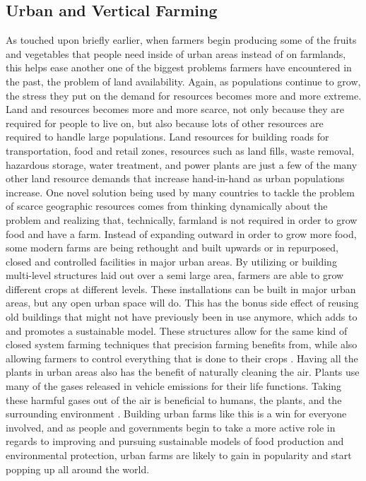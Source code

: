 \documentclass[sigconf]{acmart}
\begin{document}
\subsection{Urban and Vertical Farming}

As touched upon briefly earlier, when farmers begin producing some of the fruits and vegetables that people need inside of urban areas instead of on farmlands, this helps ease another one of the biggest problems farmers have encountered in the past, the problem of land availability. Again, as populations continue to grow, the stress they put on the demand for resources becomes more and more extreme. Land and resources becomes more and more scarce, not only because they are required for people to live on, but also because lots of other resources are required to handle large populations. Land resources for building roads for transportation, food and retail zones, resources such as land fills, waste removal, hazardous storage, water treatment, and power plants are just a few of the many other land resource demands that increase hand-in-hand as urban populations increase. One novel solution being used by many countries to tackle the problem of scarce geographic resources comes from thinking dynamically about the problem and realizing that, technically, farmland is not required in order to grow food and have a farm. Instead of expanding outward in order to grow more food, some modern farms are being rethought and built upwards or in repurposed, closed and controlled facilities in major urban areas. By utilizing or building multi-level structures laid out over a semi large area, farmers are able to grow different crops at different levels. These installations can be built in major urban areas, but any open urban space will do. This has the bonus side effect of reusing old buildings that might not have previously been in use anymore, which adds to and promotes a sustainable model. These structures allow for the same kind of closed system farming techniques that precision farming benefits from, while also allowing farmers to control everything that is done to their crops \cite{despommier2013}. Having all the plants in urban areas also has the benefit of naturally cleaning the air. Plants use many of the gases released in vehicle emissions for their life functions. Taking these harmful gases out of the air is beneficial to humans, the plants, and the surrounding environment \cite{despommier2013}. Building urban farms like this is a win for everyone involved, and as people and governments begin to take a more active role in regards to improving and pursuing sustainable models of food production and environmental protection, urban farms are likely to gain in popularity and start popping up all around the world.
\end{document}
